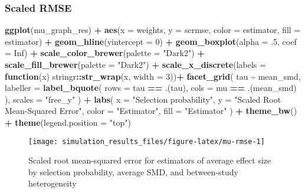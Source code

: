 \documentclass[
]{article}
\newenvironment{Shaded}{\begin{snugshade}}{\end{snugshade}}
\newcommand{\AttributeTok}[1]{\textcolor[rgb]{0.13,0.29,0.53}{#1}}
\newcommand{\ConstantTok}[1]{\textcolor[rgb]{0.56,0.35,0.01}{#1}}
\newcommand{\ControlFlowTok}[1]{\textcolor[rgb]{0.13,0.29,0.53}{\textbf{#1}}}
\newcommand{\DecValTok}[1]{\textcolor[rgb]{0.00,0.00,0.81}{#1}}
\newcommand{\FunctionTok}[1]{\textcolor[rgb]{0.13,0.29,0.53}{\textbf{#1}}}
\newcommand{\NormalTok}[1]{#1}
\newcommand{\SpecialCharTok}[1]{\textcolor[rgb]{0.81,0.36,0.00}{\textbf{#1}}}
\newcommand{\StringTok}[1]{\textcolor[rgb]{0.31,0.60,0.02}{#1}}
\begin{document}
\subsubsection{Scaled RMSE}\label{scaled-rmse}

\begin{Shaded}
\begin{Highlighting}[]
\FunctionTok{ggplot}\NormalTok{(mu\_graph\_res) }\SpecialCharTok{+} 
  \FunctionTok{aes}\NormalTok{(}\AttributeTok{x =}\NormalTok{ weights, }\AttributeTok{y =}\NormalTok{ scrmse, }\AttributeTok{color =}\NormalTok{ estimator, }\AttributeTok{fill =}\NormalTok{ estimator) }\SpecialCharTok{+}
  \FunctionTok{geom\_hline}\NormalTok{(}\AttributeTok{yintercept =} \DecValTok{0}\NormalTok{) }\SpecialCharTok{+}
  \FunctionTok{geom\_boxplot}\NormalTok{(}\AttributeTok{alpha =}\NormalTok{ .}\DecValTok{5}\NormalTok{, }\AttributeTok{coef =} \ConstantTok{Inf}\NormalTok{) }\SpecialCharTok{+}
  \FunctionTok{scale\_color\_brewer}\NormalTok{(}\AttributeTok{palette =} \StringTok{"Dark2"}\NormalTok{) }\SpecialCharTok{+}
  \FunctionTok{scale\_fill\_brewer}\NormalTok{(}\AttributeTok{palette =} \StringTok{"Dark2"}\NormalTok{) }\SpecialCharTok{+}
  \FunctionTok{scale\_x\_discrete}\NormalTok{(}\AttributeTok{labels =} \ControlFlowTok{function}\NormalTok{(x) stringr}\SpecialCharTok{::}\FunctionTok{str\_wrap}\NormalTok{(x, }\AttributeTok{width =} \DecValTok{3}\NormalTok{))}\SpecialCharTok{+}
  \FunctionTok{facet\_grid}\NormalTok{(}
\NormalTok{    tau }\SpecialCharTok{\textasciitilde{}}\NormalTok{ mean\_smd, }
    \AttributeTok{labeller =} \FunctionTok{label\_bquote}\NormalTok{(}
      \AttributeTok{rows =}\NormalTok{ tau }\SpecialCharTok{==}\NormalTok{ .(tau),}
      \AttributeTok{cols =}\NormalTok{ mu }\SpecialCharTok{==}\NormalTok{ .(mean\_smd)}
\NormalTok{    ),}
    \AttributeTok{scales =} \StringTok{"free\_y"}
\NormalTok{  ) }\SpecialCharTok{+}
  \FunctionTok{labs}\NormalTok{(}
    \AttributeTok{x =} \StringTok{"Selection probability"}\NormalTok{, }
    \AttributeTok{y =} \StringTok{"Scaled Root Mean{-}Squared Error"}\NormalTok{, }
    \AttributeTok{color =} \StringTok{"Estimator"}\NormalTok{,}
    \AttributeTok{fill =} \StringTok{"Estimator"}
\NormalTok{  ) }\SpecialCharTok{+} 
  \FunctionTok{theme\_bw}\NormalTok{() }\SpecialCharTok{+}
  \FunctionTok{theme}\NormalTok{(}\AttributeTok{legend.position =} \StringTok{"top"}\NormalTok{)}
\end{Highlighting}
\end{Shaded}

\begin{sidewaysfigure}
\texttt{[image: simulation\_results\_files/figure-latex/mu-rmse-1]} \caption{Scaled root mean-squared error for estimators of average effect size by selection probability, average SMD, and between-study heterogeneity}\label{fig:mu-rmse}
\end{sidewaysfigure}
\end{document}
